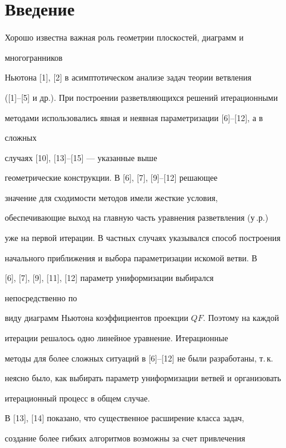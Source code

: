 \label{begin}








\section*{Введение}





Хорошо известна важная роль геометрии плоскостей, диаграмм и


многогранников


Ньютона [1], [2] в асимптотическом анализе задач теории ветвления


([1]--[5] и др.). При построении разветвляющихся решений итерационными


методами использовались явная и неявная параметризации [6]--[12], а в


сложных


случаях [10], [13]--[15] --- указанные выше


геометрические конструкции. В [6], [7], [9]--[12] решающее


значение для сходимости методов имели жесткие условия,


обеспечивающие выход на главную часть уравнения разветвления (у\,.р.)


уже на первой итерации. В частных случаях указывался способ построения


начального приближения и выбора параметризации искомой ветви. В


[6], [7], [9], [11], [12]  параметр униформизации выбирался


непосредственно по


виду диаграмм Ньютона коэффициентов проекции $QF$. Поэтому на каждой


итерации решалось одно  линейное уравнение. Итерационные


методы для более сложных ситуаций в [6]--[12] не были разработаны, т.\,к.


неясно было, как выбирать параметр униформизации ветвей и организовать


итерационный процесс в общем случае.





В [13], [14] показано, что существенное расширение класса задач,


создание более гибких алгоритмов возможны за счет привлечения


